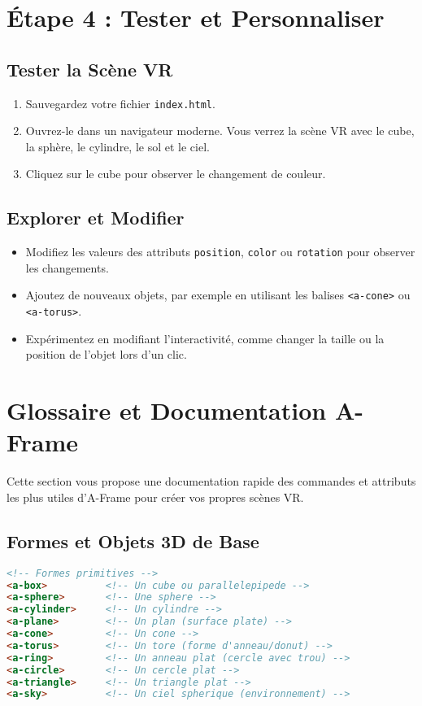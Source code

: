 \documentclass[12pt]{article}
\begin{document}
\section{Étape 4 : Tester et Personnaliser}
\subsection{Tester la Scène VR}
\begin{enumerate}
    \item Sauvegardez votre fichier \texttt{index.html}.
    \item Ouvrez-le dans un navigateur moderne. Vous verrez la scène VR avec le cube, la sphère, le cylindre, le sol et le ciel.
    \item Cliquez sur le cube pour observer le changement de couleur.
\end{enumerate}

\subsection{Explorer et Modifier}
\begin{itemize}
    \item Modifiez les valeurs des attributs \texttt{position}, \texttt{color} ou \texttt{rotation} pour observer les changements.
    \item Ajoutez de nouveaux objets, par exemple en utilisant les balises \texttt{<a-cone>} ou \texttt{<a-torus>}.
    \item Expérimentez en modifiant l'interactivité, comme changer la taille ou la position de l'objet lors d'un clic.
\end{itemize}

\section{Glossaire et Documentation A-Frame}

Cette section vous propose une documentation rapide des commandes et attributs les plus utiles d'A-Frame pour créer vos propres scènes VR.

\subsection{Formes et Objets 3D de Base}

\begin{lstlisting}[language=HTML]
<!-- Formes primitives -->
<a-box>          <!-- Un cube ou parallelepipede -->
<a-sphere>       <!-- Une sphere -->
<a-cylinder>     <!-- Un cylindre -->
<a-plane>        <!-- Un plan (surface plate) -->
<a-cone>         <!-- Un cone -->
<a-torus>        <!-- Un tore (forme d'anneau/donut) -->
<a-ring>         <!-- Un anneau plat (cercle avec trou) -->
<a-circle>       <!-- Un cercle plat -->
<a-triangle>     <!-- Un triangle plat -->
<a-sky>          <!-- Un ciel spherique (environnement) -->
\end{lstlisting}
\end{document}
